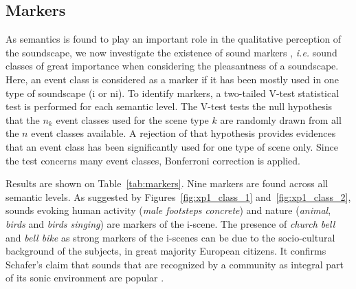 \documentclass[twoside,twocolumn]{article}
\begin{document}

\subsection{Markers}
\label{sec:markers}

As semantics is found to play an important role in the qualitative perception of the soundscape, we now investigate the existence of sound markers  , \textit{i.e.} sound classes of great importance when considering the pleasantness of a soundscape. Here, an event class is considered as a marker if it has been mostly used in one type of soundscape (i or ni). To identify markers, a two-tailed V-test statistical test is performed for each semantic level. The V-test tests the null hypothesis that the $n_k$ event classes used for the scene type $k$ are randomly drawn from all the $n$ event classes available. A rejection of that hypothesis provides evidences that an event class has been significantly used for one type of scene only. Since the test concerns many event classes, Bonferroni correction is applied.

Results are shown on Table~\ref{tab:markers}. Nine markers are found across all semantic levels. As suggested by Figures~\ref{fig:xp1_class_1} and~\ref{fig:xp1_class_2}, sounds evoking human activity (\textit{male footsteps concrete}) and nature (\textit{animal}, \textit{birds} and \textit{birds singing}) are markers of the i-scene. The presence of \textit{church bell} and \textit{bell bike} as strong markers of the i-scenes can be due to the socio-cultural background of the subjects, in great majority European citizens. It confirms Schafer's claim that sounds that are recognized by a community as integral part of its sonic environment are popular \cite{schafer1977tuning}. 
\end{document}
